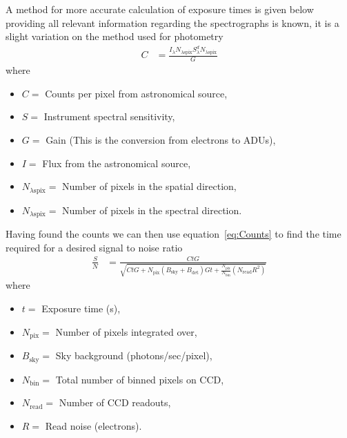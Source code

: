 	A method for more accurate calculation of exposure times is given below providing all relevant information regarding the spectrographs is known, it is a slight variation on the method used for photometry
	\begin{align}
		C &= \frac{I_\lambda N_{\lambda \text{spix}}S_\lambda^d N_{\lambda \text{spix}}}{G}
	\end{align}
	where
	\begin{itemize}
		\item $C =$ Counts per pixel from astronomical source,
		\item $S =$ Instrument spectral sensitivity,
		\item $G =$ Gain (This is the conversion from electrons to ADUs),
		\item $I =$ Flux from the astronomical source,
		\item $N_{\lambda \text{spix}} =$ Number of pixels in the spatial direction,
		\item $N_{\lambda \text{spix}} =$ Number of pixels in the spectral direction.
	\end{itemize}
	Having found the counts we can then use equation~\ref{eq:Counts}\cite{Counts} to find the time required for a desired signal to noise ratio
	\begin{align}
		\frac{S}{N} &= \frac{CtG}{\sqrt{CtG + N_\text{pix}(B_\text{sky} + B_\text{det}) Gt + \frac{N_\text{pix}}{N_\text{bin}}(N_\text{read} R^2)}} \label{eq:Counts}
	\end{align}
	where
	\begin{itemize}
		\item $t =$ Exposure time (s),
		\item $N_\text{pix} =$ Number of pixels integrated over,
		\item $B_\text{sky} =$ Sky background (photons/sec/pixel),
		\item $N_\text{bin} =$ Total number of binned pixels on CCD,
		\item $N_\text{read} =$ Number of CCD readouts,
		\item $R =$ Read noise (electrons)\cite{Counts}\cite{Signal}.
	\end{itemize}
